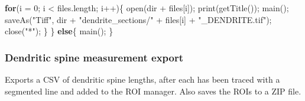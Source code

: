\documentclass[
  12pt,
  a4paper,
]{book}
\newenvironment{Shaded}{}{}
\newcommand{\ControlFlowTok}[1]{\textcolor[rgb]{0.00,0.44,0.13}{\textbf{#1}}}
\newcommand{\DecValTok}[1]{\textcolor[rgb]{0.25,0.63,0.44}{#1}}
\newcommand{\NormalTok}[1]{#1}
\newcommand{\OperatorTok}[1]{\textcolor[rgb]{0.40,0.40,0.40}{#1}}
\newcommand{\StringTok}[1]{\textcolor[rgb]{0.25,0.44,0.63}{#1}}
\begin{document}
\begin{Shaded}
\begin{Highlighting}[]
    \ControlFlowTok{for}\OperatorTok{(}\NormalTok{i }\OperatorTok{=} \DecValTok{0}\OperatorTok{;}\NormalTok{ i }\OperatorTok{\textless{}}\NormalTok{ files}\OperatorTok{.}\NormalTok{length}\OperatorTok{;}\NormalTok{ i}\OperatorTok{++)\{}
\NormalTok{        open}\OperatorTok{(}\NormalTok{dir }\OperatorTok{+}\NormalTok{ files}\OperatorTok{[}\NormalTok{i}\OperatorTok{]);}
\NormalTok{        print}\OperatorTok{(}\NormalTok{getTitle}\OperatorTok{());}
\NormalTok{        main}\OperatorTok{();}
\NormalTok{        saveAs}\OperatorTok{(}\StringTok{"Tiff"}\OperatorTok{,}\NormalTok{ dir }\OperatorTok{+} \StringTok{"dendrite\_sections/"} \OperatorTok{+}\NormalTok{ files}\OperatorTok{[}\NormalTok{i}\OperatorTok{]} \OperatorTok{+} \StringTok{"\_DENDRITE.tif"}\OperatorTok{);}
\NormalTok{        close}\OperatorTok{(}\StringTok{"*"}\OperatorTok{);}
    \OperatorTok{\}}
\OperatorTok{\}}
\ControlFlowTok{else}\OperatorTok{\{}
\NormalTok{    main}\OperatorTok{();}
\OperatorTok{\}}
\end{Highlighting}
\end{Shaded}

\hypertarget{dendritic-spine-measurement-export}{%
\subsubsection{Dendritic spine measurement export}\label{dendritic-spine-measurement-export}}

Exports a CSV of dendritic spine lengths, after each has been traced with a segmented line and added to the ROI manager. Also saves the ROIs to a ZIP file.
\end{document}
